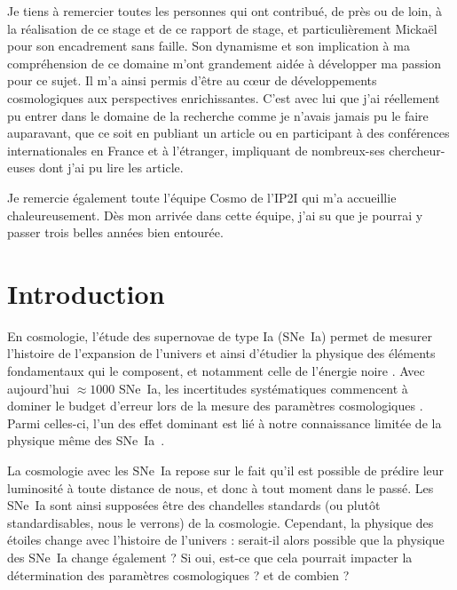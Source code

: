 \documentclass[a4paper, 12pt, svgnames]{article}
\begin{document}

Je tiens à remercier toutes les personnes qui ont contribué, de près ou de loin,
à la réalisation de ce stage et de ce rapport de stage, et particulièrement
Mickaël  pour son encadrement sans faille. Son dynamisme et son
implication à ma compréhension de ce domaine m'ont grandement aidée à développer
ma passion pour ce sujet. Il m'a ainsi permis d'être au cœur de développements
cosmologiques aux perspectives enrichissantes. C'est avec lui que j'ai
réellement pu entrer dans le domaine de la recherche comme je n'avais jamais pu
le faire auparavant, que ce soit en publiant un article ou en participant à des
conférences internationales en France et à l'étranger, impliquant de
nombreux-ses chercheur-euses dont j'ai pu lire les article. \bigbreak

Je remercie également toute l'équipe Cosmo de l'IP2I qui m'a accueillie
chaleureusement. Dès mon arrivée dans cette équipe, j'ai su que je pourrai y
passer trois belles années bien entourée.

\tableofcontents
\newpage

\section{Introduction}\label{sec:int}

En cosmologie, l'étude des supernovae de type Ia (SNe~Ia) permet de mesurer
l'histoire de l'expansion de l'univers et ainsi d'étudier la physique des
éléments fondamentaux qui le composent, et notamment celle de l'énergie noire
\cite{perlmutter_measurements_1999, riess_observational_1998}. Avec aujourd'hui
$\approx1000$ SNe~Ia, les incertitudes systématiques commencent à dominer le
budget d'erreur lors de la mesure des paramètres cosmologiques
\cite{betoule_improved_2014, scolnic_complete_2018}. Parmi celles-ci, l'un des
effet dominant est lié à notre connaissance limitée de la physique même des
SNe~Ia~\cite{sullivan_dependence_2010, rigault_evidence_2013,
rigault_confirmation_2015}.\bigbreak

La cosmologie avec les SNe~Ia repose sur le fait qu'il est possible de prédire
leur luminosité à toute distance de nous, et donc à tout moment dans le passé.
Les SNe~Ia sont ainsi supposées être des chandelles standards (ou plutôt
standardisables, nous le verrons) de la cosmologie. Cependant, la physique des
étoiles change avec l'histoire de l'univers : serait-il alors possible que la
physique des SNe~Ia change également ? Si oui, est-ce que cela pourrait impacter
la détermination des paramètres cosmologiques ? et de combien ? \bigbreak
\end{document}
